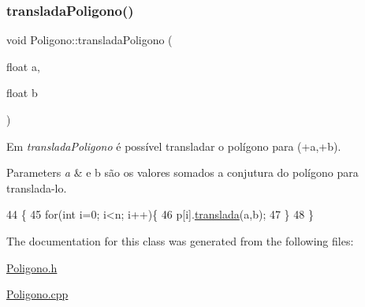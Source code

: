 \subsubsection{\texorpdfstring{translada\+Poligono()}{transladaPoligono()}}
{\footnotesize\ttfamily void Poligono\+::translada\+Poligono (\begin{DoxyParamCaption}\item[{float}]{a,  }\item[{float}]{b }\end{DoxyParamCaption})}



Em {\itshape translada\+Poligono} é possível transladar o polígono para (+a,+b). 


\begin{DoxyParams}{Parameters}
{\em a} & e b são os valores somados a conjutura do polígono para translada-\/lo. \\
\hline
\end{DoxyParams}

\begin{DoxyCode}
44                                                 \{
45     \textcolor{keywordflow}{for}(\textcolor{keywordtype}{int} i=0; i<n; i++)\{
46         p[i].\hyperlink{class_point_ad9676e36f3444534b609e3c68422239a}{translada}(a,b);
47     \}
48 \}
\end{DoxyCode}


The documentation for this class was generated from the following files\+:\begin{DoxyCompactItemize}
\item 
\hyperlink{_poligono_8h}{Poligono.\+h}\item 
\hyperlink{_poligono_8cpp}{Poligono.\+cpp}\end{DoxyCompactItemize}
